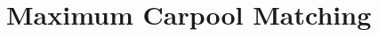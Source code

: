 \newcommand{\defpath}[1]{\def\path{content/#1}}
\newcommand{\add}[1]{}





\chapter{Maximum Carpool Matching}
\label{chapter:maximum-carpool-matching}
\defpath{carpool}
\add{carpool}